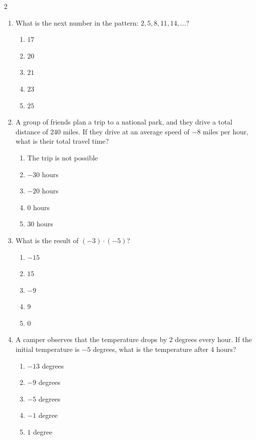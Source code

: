 \documentclass[10pt]{article}
\begin{document}
\begin{multicols}{2}
\begin{enumerate}[label=\textbf{Q\arabic*.}, leftmargin=*, itemsep=6pt, parsep=0pt]
  \item \small What is the next number in the pattern: $2, 5, 8, 11, 14, ...$?
  \begin{enumerate}[label=(\Alph*), leftmargin=0.6cm, nosep, itemsep=2pt]
    \item $17$
    \item $20$
    \item $21$
    \item $23$
    \item $25$
  \end{enumerate}

  \item \small A group of friends plan a trip to a national park, and they drive a total distance of $240$ miles. If they drive at an average speed of $-8$ miles per hour, what is their total travel time?
  \begin{enumerate}[label=(\Alph*), leftmargin=0.6cm, nosep, itemsep=2pt]
    \item The trip is not possible
    \item $-30$ hours
    \item $-20$ hours
    \item $0$ hours
    \item $30$ hours
  \end{enumerate}

  \item \small What is the result of $(-3) \cdot (-5)$?
  \begin{enumerate}[label=(\Alph*), leftmargin=0.6cm, nosep, itemsep=2pt]
    \item $-15$
    \item $15$
    \item $-9$
    \item $9$
    \item $0$
  \end{enumerate}

  \item \small A camper observes that the temperature drops by $2$ degrees every hour. If the initial temperature is $-5$ degrees, what is the temperature after $4$ hours?
  \begin{enumerate}[label=(\Alph*), leftmargin=0.6cm, nosep, itemsep=2pt]
    \item $-13$ degrees
    \item $-9$ degrees
    \item $-5$ degrees
    \item $-1$ degree
    \item $1$ degree
  \end{enumerate}


\end{enumerate}
\end{multicols}
\end{document}

